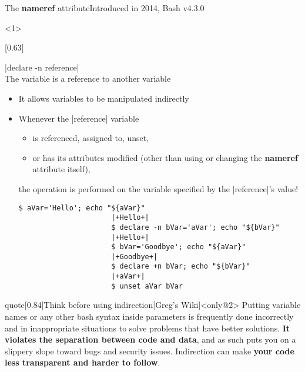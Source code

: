 
\begin{frame}[fragile]{The \textbf{nameref} attribute}{Introduced in 2014, Bash v4.3.0}
    \vspace{-2mm}
    \begin{onlyenv}<1>
        \vspace{-2mm}
        \begin{varblock}{}[0.63\textwidth]{}
        \begin{description}
            \item[\textbf{Reference:}]
                \bash|declare -n reference|\\
                The variable is a reference to another variable
        \end{description}
        \end{varblock}
        \begin{itemize}
            \item It allows variables to be manipulated indirectly
            \item Whenever the \bash|reference| variable
                  \begin{itemize}
                      \item is referenced, assigned to, unset,
                      \item or has its attributes modified (other than using or changing the \textbf{nameref} attribute itself),
                  \end{itemize}
                  the operation is performed on the variable specified by the \bash|reference|'s value!
                  \begin{lstlisting}[style=MyBash, style=oddnumbers, xleftmargin=6mm, xrightmargin=15mm, aboveskip=3mm]
                      $ aVar='Hello'; echo "${aVar}"
                      |+Hello+|
                      $ declare -n bVar='aVar'; echo "${bVar}"
                      |+Hello+|
                      $ bVar='Goodbye'; echo "${aVar}"
                      |+Goodbye+|
                      $ declare +n bVar; echo "${bVar}"
                      |+aVar+|
                      $ unset aVar bVar
                  \end{lstlisting}
        \end{itemize}
    \end{onlyenv}
    \begin{varblock}{quote}[0.84\textwidth]{Think before using indirection}[Greg's Wiki]<only@2>
        Putting variable names or any other bash syntax inside parameters is frequently done incorrectly and in inappropriate situations to solve problems that have better solutions.
        \textbf{It violates the separation between code and data}, and as such puts you on a slippery slope toward bugs and security issues.
        Indirection can make \textbf{your code less transparent and harder to follow}.


\end{varblock}
\end{frame}
